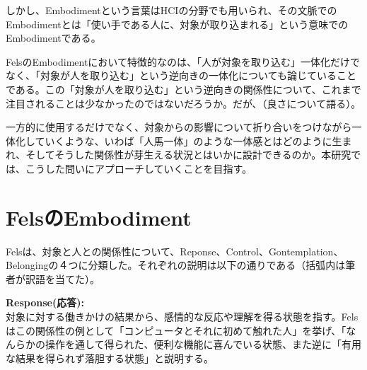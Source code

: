 しかし、Embodimentという言葉はHCIの分野でも用いられ、その文脈でのEmbodimentとは「使い手である人に、対象が取り込まれる」という意味でのEmbodimentである\cite{veq}。

FelsのEmbodimentにおいて特徴的なのは、「人が対象を取り込む」一体化だけでなく、「対象が人を取り込む」という逆向きの一体化についても論じていることである。この「対象が人を取り込む」という逆向きの関係性について、これまで注目されることは少なかったのではないだろうか。だが、（良さについて語る）。

一方的に使用するだけでなく、対象からの影響について折り合いをつけながら一体化していくような、いわば「人馬一体」のような一体感とはどのように生まれ、そしてそうした関係性が芽生える状況とはいかに設計できるのか。本研究では、こうした問いにアプローチしていくことを目指す。




\newpage

\section{FelsのEmbodiment}
Felsは、対象と人との関係性について、Reponse、Control、Gontemplation、Belongingの４つに分類した\cite{Fels}\cite{Costello2005}。それぞれの説明は以下の通りである（括弧内は筆者が訳語を当てた）。

\textbf{Response(応答):}\\
対象に対する働きかけの結果から、感情的な反応や理解を得る状態を指す。Felsはこの関係性の例として「コンピュータとそれに初めて触れた人」を挙げ、「なんらかの操作を通して得られた、便利な機能に喜んでいる状態、また逆に「有用な結果を得られず落胆する状態」と説明する。

